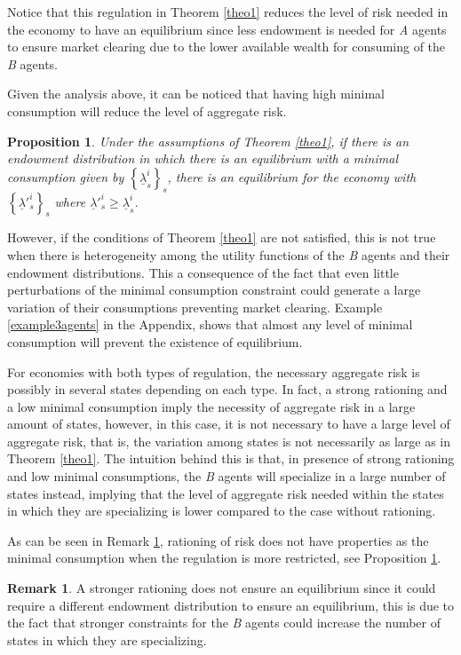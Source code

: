 \documentclass[pdftex]{article}
\numberwithin{equation}{section}
\theoremstyle{th}
\newtheorem{prop}{{Proposition}}%
\newtheorem{proof lemma}{{Proof Lemma}.}
\theoremstyle{definition}
\newtheorem{remark}{Remark}%
\newtheorem*{risk lovers}{Risk lovers}
\newtheorem*{risk averse}{Risk averse}
\begin{document}
Notice that this regulation in Theorem \ref{theo1} reduces the level of risk needed in the economy to have an equilibrium since less endowment is needed for \emph{A} agents to ensure market clearing due to the lower available wealth for consuming of the \emph{B} agents.


Given the analysis above, it can be noticed that having high minimal consumption will reduce the level of aggregate risk.

\begin{prop}
\label{prop+mincons}
Under the assumptions of Theorem \ref{theo1}, if there is an endowment distribution in which there is an equilibrium with a minimal consumption given by $\left\{\underline{\lambda}^i_s\right\}_s$, there is an equilibrium for the economy with $\left\{\underline{\lambda}'^i_s\right\}_s$ where $\underline{\lambda}'^i_s\geq\underline{\lambda}^i_s$.
\end{prop}

{However, if the conditions of Theorem \ref{theo1} are not satisfied, this is not true} when there is heterogeneity among the utility functions of the \emph{B} agents and their endowment distributions. This a consequence of the fact that even little perturbations of the minimal consumption constraint could generate a large variation of their consumptions preventing market clearing. {Example \ref{example3agents} in the Appendix, shows that almost any level of minimal consumption will prevent the existence of equilibrium.}


{For economies with both types of regulation, the necessary aggregate risk is possibly in several states depending on each type.} In fact, a strong rationing and a low minimal consumption imply the necessity of aggregate risk in a large amount of states, however, in this case, it is not necessary to have a large level of aggregate risk, that is, the variation among states is not necessarily as large as in Theorem \ref{theo1}. {The intuition behind this is that, in presence of strong rationing and low minimal consumptions, the \emph{B} agents will specialize in a large number of states instead, implying that the level of aggregate risk needed within the states in which they are specializing is lower compared to the case without rationing.}


{As can be seen in Remark \ref{remark1}, rationing of risk does not have properties as the minimal consumption when the regulation is more restricted, see Proposition \ref{prop+mincons}.}

\begin{remark}
\label{remark1}
{A stronger rationing does not ensure an equilibrium since it could require a different endowment distribution to ensure an equilibrium, this is due to the fact that stronger constraints for the \emph{B} agents could increase the number of states in which they are specializing.}
\end{remark}
\end{document}
